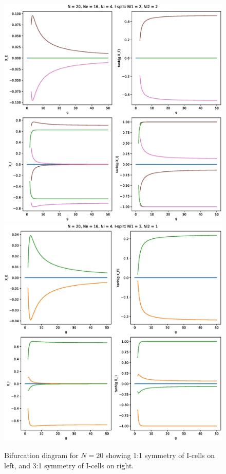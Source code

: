 \documentclass[11pt,reqno]{amsart}
\begin{document}
\begin{figure}[h]
    \centering
    \includegraphics[width=12cm]{images/20largeg22.eps} 
    \includegraphics[width=12cm]{images/20largeg31.eps} 
    \caption{Bifurcation diagram for $N = 20$ showing 1:1 symmetry of I-cells on left, and 3:1 symmetry of I-cells on right.}
    \label{fig:20symm1}
\end{figure}
\end{document}
